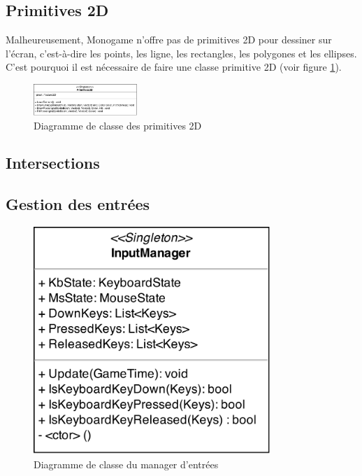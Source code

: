 \documentclass[11pt, a4paper, oneside]{report}
\begin{document}
\subsection{Primitives 2D}
Malheureusement, Monogame n'offre pas de primitives 2D pour dessiner sur l'écran, c'est-à-dire les points, les ligne, les rectangles, les polygones et les ellipses. C'est pourquoi il est nécessaire de faire une classe primitive 2D (voir figure \ref{fig:Primitives2D}).
\begin{figure}[h]
	\begin{center}
	\includegraphics[width=0.35\textwidth]{Primitives2D}
	\caption{Diagramme de classe des primitives 2D}
	\label{fig:Primitives2D}
	\end{center}
\end{figure}

\subsection{Intersections}
\label{subsec:intersections}
\subsection{Gestion des entrées}
\begin{figure}[H]
	\begin{center}
	\includegraphics[width=0.8\textwidth]{InputManager}
	\caption{Diagramme de classe du manager d'entrées}
	\label{fig:InputManager}
	\end{center}
\end{figure}
\end{document}
